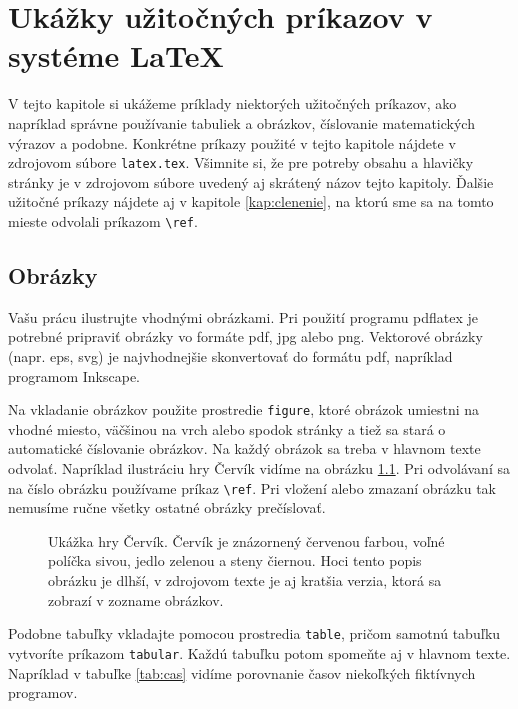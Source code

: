 \chapter[LaTeX]{Ukážky užitočných príkazov v systéme LaTeX}
\label{kap:latex}

V tejto kapitole si ukážeme príklady niektorých užitočných príkazov,
ako napríklad správne používanie tabuliek a obrázkov, číslovanie
matematických výrazov a podobne. Konkrétne príkazy použité v tejto
kapitole nájdete v zdrojovom súbore \verb'latex.tex'.  Všimnite si, že
pre potreby obsahu a hlavičky stránky je v zdrojovom súbore uvedený aj
skrátený názov tejto kapitoly. Ďalšie užitočné príkazy nájdete aj v
kapitole \ref{kap:clenenie}, na ktorú sme sa na tomto mieste odvolali
príkazom \verb'\ref'.

\section{Obrázky}

Vašu prácu ilustrujte vhodnými obrázkami. Pri použití programu
pdflatex je potrebné pripraviť obrázky vo formáte pdf, jpg alebo
png. Vektorové obrázky (napr. eps, svg) je najvhodnejšie skonvertovať
do formátu pdf, napríklad programom Inkscape.

Na vkladanie obrázkov použite prostredie \verb'figure', ktoré obrázok
umiestni na vhodné miesto, väčšinou na vrch alebo spodok stránky a
tiež sa stará o automatické číslovanie obrázkov. Na každý obrázok sa
treba v hlavnom texte odvolať. Napríklad ilustráciu hry Červík vidíme
na obrázku \ref{obr:cursus}. Pri odvolávaní sa na číslo obrázku
používame príkaz \verb'\ref'. Pri vložení alebo zmazaní obrázku tak
nemusíme ručne všetky ostatné obrázky prečíslovať.

\begin{figure}
\caption[Ukážka hry Červík]{Ukážka hry Červík. Červík je znázornený červenou farbou, voľné políčka sivou, jedlo zelenou a steny čiernou. Hoci tento popis obrázku je dlhší, v zdrojovom texte je aj kratšia verzia, ktorá sa zobrazí v zozname obrázkov.}
\label{obr:cursus}
\end{figure}

Podobne tabuľky vkladajte pomocou prostredia \verb'table', pričom
samotnú tabuľku vytvoríte príkazom \verb'tabular'. Každú tabuľku potom
spomeňte aj v hlavnom texte. Napríklad v tabuľke \ref{tab:cas}
vidíme porovnanie časov niekoľkých fiktívnych programov.

